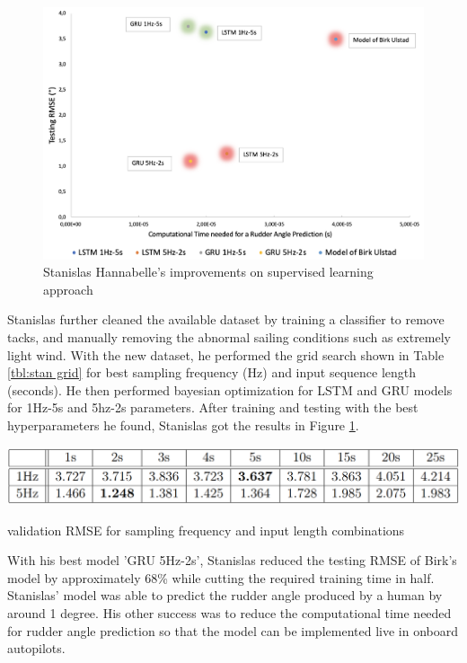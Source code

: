 \documentclass[12pt,twoside]{report}
\begin{document}
\begin{figure}[h]
\centering
\includegraphics[width = 0.9\hsize]{figures/stan results.png}
\caption{Stanislas Hannabelle's improvements on supervised learning approach}
\label{fig:stan results}
\end{figure}

Stanislas further cleaned the available dataset by training a classifier to remove tacks, and manually removing the abnormal sailing conditions such as extremely light wind. With the new dataset, he performed the grid search shown in Table \ref{tbl:stan grid} for best sampling frequency (Hz) and input sequence length (seconds). He then performed bayesian optimization for LSTM and GRU models for 1Hz-5s and 5hz-2s parameters. After training and testing with the best hyperparameters he found, Stanislas got the results in Figure \ref{fig:stan results}.

\begin{table}[h]
\centering
\includegraphics[width=\linewidth]{figures/stan grid search.png}
\caption{validation RMSE for sampling frequency and input length combinations}
\label{tbl:stan grid}
\end{table}

With his best model 'GRU 5Hz-2s', Stanislas reduced the testing RMSE of Birk's model by approximately 68\% while cutting the required training time in half. Stanislas' model was able to predict the rudder angle produced by a human by around 1 degree. His other success was to reduce the computational time needed for rudder angle prediction so that the model can be implemented live in onboard autopilots.
\end{document}
